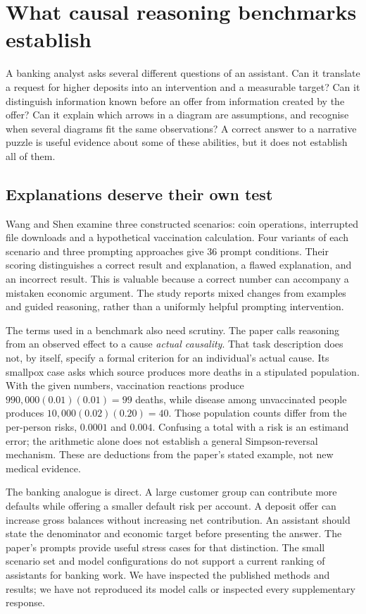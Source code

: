 \section{What causal reasoning benchmarks establish}
\label{gap29:frontier}
A banking analyst asks several different questions of an assistant. Can it
translate a request for higher deposits into an intervention and a measurable
target? Can it distinguish information known before an offer from information
created by the offer? Can it explain which arrows in a diagram are assumptions,
and recognise when several diagrams fit the same observations? A correct
answer to a narrative puzzle is useful evidence about some of these abilities,
but it does not establish all of them.

\subsection{Explanations deserve their own test}
Wang and Shen examine three constructed scenarios: coin operations, interrupted
file downloads and a hypothetical vaccination calculation. Four variants of
each scenario and three prompting approaches give 36 prompt conditions.
Their scoring distinguishes a correct result and explanation, a flawed
explanation, and an incorrect result. This is valuable because a correct
number can accompany a mistaken economic argument. The study reports mixed
changes from examples and guided reasoning, rather than a uniformly helpful
prompting intervention. \citep{gap29wangshen}

The terms used in a benchmark also need scrutiny. The paper calls reasoning
from an observed effect to a cause \emph{actual causality}. That task description
does not, by itself, specify a formal criterion for an individual's actual
cause. Its smallpox case asks which source produces more deaths in a stipulated
population. With the given numbers, vaccination reactions produce
$990{,}000(0.01)(0.01)=99$ deaths, while disease among unvaccinated people
produces $10{,}000(0.02)(0.20)=40$. Those population counts differ from the
per-person risks, $0.0001$ and $0.004$. Confusing a total with a risk is an
estimand error; the arithmetic alone does not establish a general
Simpson-reversal mechanism. These are deductions from the paper's stated
example, not new medical evidence.

The banking analogue is direct. A large customer group can contribute more
defaults while offering a smaller default risk per account. A deposit offer
can increase gross balances without increasing net contribution. An assistant
should state the denominator and economic target before presenting the
answer. The paper's prompts provide useful stress cases for that distinction.
The small scenario set and model configurations do not support a current
ranking of assistants for banking work. We have inspected the published
methods and results; we have not reproduced its model calls or inspected every
supplementary response.

